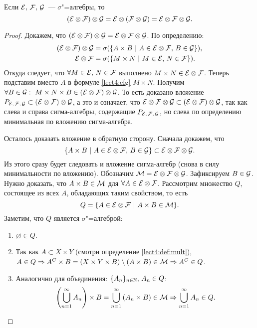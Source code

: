 \begin{claim}
    Если $\mathcal{E},\,\mathcal{F} ,\,\mathcal{G}$~--- $\sigma$"=алгебры, то
    \[
        (\mathcal{E}\otimes\mathcal{F} )\otimes\mathcal{G}=\mathcal{E}\otimes(\mathcal{F} \otimes\mathcal{G})=\mathcal{E}\otimes\mathcal{F} \otimes\mathcal{G}.
    \]

    \begin{proof}
        Докажем, что $(\mathcal{E}\otimes\mathcal{F} )\otimes\mathcal{G}=\mathcal{E}\otimes\mathcal{F} \otimes\mathcal{G}$.
        По определению:
        \begin{align}
            (\CE\otimes\F)\otimes\CG & =\sigma(\{A\times B\ \vert\ A\in\CE\otimes\F,\, B\in\CG\}),\label{lect4:efg} \\
            \CE\otimes\F             & =\sigma(\{M\times N\ \vert\ M\in\CE,\, N\in\F\}).
        \end{align}
        Откуда следует, что $\forall M\in\mathcal{E},\, N\in\mathcal{F} $ выполнено $M\times N\in\mathcal{E}\otimes\mathcal{F} $.
        Теперь подставим вместо $A$ в формуле \eqref{lect4:efg} $M\times N$. Получим
        $\forall B\in\mathcal{G}:\ M\times N\times B\in(\mathcal{E}\otimes\mathcal{F} )\otimes \mathcal{G}$. То есть доказано вложение
        $P_{\mathcal{E},\,\mathcal{F} ,\,\mathcal{G}}\subset (\mathcal{E}\otimes\mathcal{F} )\otimes \mathcal{G}$, а это и означает, что
        $\mathcal{E}\otimes\mathcal{F} \otimes\mathcal{G}\subset (\mathcal{E}\otimes\mathcal{F} )\otimes \mathcal{G}$, так как слева и справа сигма-алгебры,
        содержащие $P_{\mathcal{E},\,\mathcal{F} ,\,\mathcal{G}}$, но слева по определению минимальная по вложению сигма-алгебра.

        Осталось доказать вложение в обратную сторону. Сначала докажем, что
        \[
            \{A\times B\ \vert\ A\in\mathcal{E}\otimes\mathcal{F} ,\, B\in\mathcal{G}\}\subset\mathcal{E}\otimes\mathcal{F} \otimes\mathcal{G}.
        \]
        Из этого сразу будет следовать и вложение сигма-алгебр (снова в силу минимальности по вложению).
        Обозначим $\mathcal{M}=\mathcal{E}\otimes\mathcal{F} \otimes\mathcal{G}$.
        Зафиксируем $B\in\mathcal{G}$. Нужно доказать, что $A\times B\in\mathcal{M}$ для $\forall A\in\mathcal{E}\otimes\mathcal{F} $.
        Рассмотрим множество $Q$, состоящее из всех $A$, обладающих таким свойством, то есть
        \[
            Q=\{A\in\mathcal{E}\otimes\mathcal{F} \ \vert\ A\times B\in\mathcal{M}\}.
        \]
        Заметим, что $Q$ является $\sigma$"=алгеброй:
        \begin{enumerate}[label=\arabic*\degree.]
            \item $\varnothing\in Q$.
            \item Так как $A\subset X\times Y$ (смотри определение \ref{lect4:def:mult}),
                  $A\in Q\Rightarrow A^C\times B=(X\times Y\times B)\setminus (A\times B)\in\mathcal{M}\Rightarrow A^C\in Q$.
            \item Аналогично для объединения: $\{A_n\}_{n\in\mathbb{N}},\, A_n\in Q$:
                  \[
                      \left(\bigcup_{n=1}^{\infty}A_n\right)\times B=\bigcup_{n=1}^{\infty}\left(A_n\times B\right)\in\mathcal{M}
                      \Rightarrow\bigcup_{n=1}^{\infty}A_n\in Q.
                  \]
        \end{enumerate}


\end{proof}
\end{claim}
